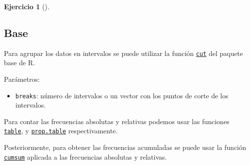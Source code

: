 \documentclass[
  a4paper,
]{scrreport}
\newenvironment{Shaded}{\begin{snugshade}}{\end{snugshade}}
\newcommand{\AttributeTok}[1]{\textcolor[rgb]{0.40,0.45,0.13}{#1}}
\newcommand{\CommentTok}[1]{\textcolor[rgb]{0.37,0.37,0.37}{#1}}
\newcommand{\DecValTok}[1]{\textcolor[rgb]{0.68,0.00,0.00}{#1}}
\newcommand{\FunctionTok}[1]{\textcolor[rgb]{0.28,0.35,0.67}{#1}}
\newcommand{\NormalTok}[1]{\textcolor[rgb]{0.00,0.23,0.31}{#1}}
\newcommand{\OtherTok}[1]{\textcolor[rgb]{0.00,0.23,0.31}{#1}}
\newcommand{\SpecialCharTok}[1]{\textcolor[rgb]{0.37,0.37,0.37}{#1}}
\providecommand{\tightlist}{%
  \setlength{\itemsep}{0pt}\setlength{\parskip}{0pt}}\usepackage{longtable,booktabs,array}
\theoremstyle{definition}
\newtheorem{exercise}{Ejercicio}[chapter]
\theoremstyle{remark}
\begin{document}
\begin{exercise}[]
\begin{enumerate}
\begin{tcolorbox}
  \section{Base}

  Para agrupar los datos en intervalos se puede utilizar la función
  \href{https://www.rdocumentation.org/packages/base/versions/3.6.2/topics/cut}{\texttt{cut}}
  del paquete base de R.

  Parámetros:

  \begin{itemize}
  \tightlist
  \item
    \texttt{breaks}: número de intervalos o un vector con los puntos de
    corte de los intervalos.
  \end{itemize}

  Para contar las frecuencias absolutas y relativas podemos usar las
  funciones
  \href{https://www.rdocumentation.org/packages/base/versions/3.6.2/topics/table}{\texttt{table}},
  y
  \href{https://www.rdocumentation.org/packages/base/versions/3.6.2/topics/prop.table}{\texttt{prop.table}}
  respectivamente.

  Posteriormente, para obtener las frecuencias acumuladas se puede usar
  la función
  \href{https://www.rdocumentation.org/packages/base/versions/3.6.2/topics/cumsum}{\texttt{cumsum}}
  aplicada a las frecuencias absolutas y relativas.

\begin{Shaded}
\end{Shaded}


\end{tcolorbox}
\end{enumerate}
\end{exercise}
\end{document}
